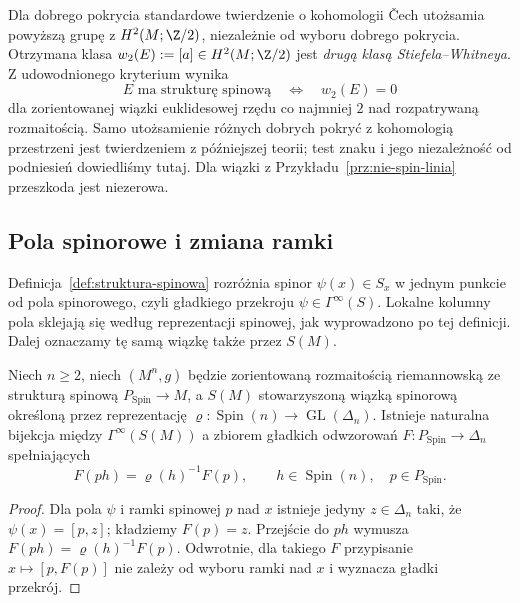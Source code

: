 \begin{uwaga}
Dla dobrego pokrycia standardowe twierdzenie
o kohomologii Čech utożsamia powyższą grupę
z $H^2(M;\Z/2)$, niezależnie od wyboru
dobrego pokrycia. Otrzymana klasa
$w_2(E):=[a]\in H^2(M;\Z/2)$
jest \emph{drugą klasą Stiefela--Whitneya}.
Z udowodnionego kryterium wynika
\[
 E\text{ ma strukturę spinową}
 \quad\Longleftrightarrow\quad w_2(E)=0
\]
dla zorientowanej wiązki euklidesowej
rzędu co najmniej $2$ nad rozpatrywaną
rozmaitością. Samo utożsamienie różnych
dobrych pokryć z kohomologią przestrzeni jest
twierdzeniem z późniejszej teorii; test znaku
i jego niezależność od podniesień dowiedliśmy tutaj.
Dla wiązki z
Przykładu~\ref{prz:nie-spin-linia}
przeszkoda jest niezerowa.
\end{uwaga}

\subsection*{Pola spinorowe i zmiana ramki}
\label{sec:pola-spinorowe-podstawy}

Definicja~\ref{def:struktura-spinowa} rozróżnia spinor
$\psi(x)\in S_x$ w jednym punkcie od pola spinorowego,
czyli gładkiego przekroju $\psi\in\Gamma^\infty(S)$.
Lokalne kolumny pola sklejają się według reprezentacji
spinowej, jak wyprowadzono po tej definicji.
Dalej oznaczamy tę samą wiązkę także przez $S(M)$.
\begin{stwierdzenie}
\label{prop:pola-spinorowe-ekwiwariantnosc}
Niech $n\geq2$, niech $(M^n,g)$ będzie zorientowaną
rozmaitością riemannowską ze strukturą spinową
$P_{\mathrm{Spin}}\to M$, a $S(M)$ stowarzyszoną
wiązką spinorową określoną przez reprezentację
$\varrho:\operatorname{Spin}(n)\to\operatorname{GL}(\Delta_n)$.
Istnieje naturalna bijekcja między
$\Gamma^\infty(S(M))$ a zbiorem gładkich odwzorowań
$F:P_{\mathrm{Spin}}\to\Delta_n$ spełniających
\begin{equation}\label{eq:pola-spinorowe-ekwiwariantnosc}
 F(ph)=\varrho(h)^{-1}F(p),\qquad
 h\in\operatorname{Spin}(n),\quad p\in P_{\mathrm{Spin}}.
\end{equation}
\end{stwierdzenie}
\begin{proof}
Dla pola $\psi$ i ramki spinowej $p$ nad $x$ istnieje
jedyny $z\in\Delta_n$ taki, że $\psi(x)=[p,z]$;
kładziemy $F(p)=z$. Przejście do $ph$ wymusza
$F(ph)=\varrho(h)^{-1}F(p)$. Odwrotnie, dla takiego $F$
przypisanie $x\mapsto[p,F(p)]$ nie zależy od wyboru
ramki nad $x$ i wyznacza gładki przekrój.
\end{proof}

